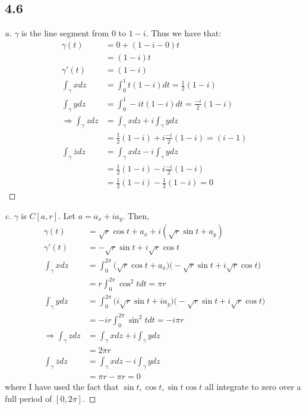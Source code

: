 \documentclass[a4paper, 11pt]{article}
\begin{document}
\subsection*{4.6}
	\begin{proof}[a]
		$\gamma$ is the line segment from $0$ to $1-i$. Thus we have that: 
			\begin{align*}
				\gamma(t) &= 0 +(1-i-0)t \\ 
					&= (1-i)t \\ 
				\gamma'(t) &= (1-i) \\ 
				\int_{\gamma}xdz &= \int_0^1 t(1-i)dt = \frac{1}{2}(1-i) \\ 
				\int_{\gamma}ydz &= \int_0^1 -it(1-i)dt = \frac{-i}{2}(1-i) \\ 
				\Rightarrow \int_\gamma z dz &= \int_\gamma x dz +i\int_\gamma y dz \\ 
					&= \frac{1}{2}(1-i)+i\frac{-i}{2}(1-i) = (i-1) \\ 
				\int_\gamma \overline{z} dz &=  \int_\gamma x dz -i\int_\gamma y dz \\ 
					&= \frac{1}{2}(1-i)-i\frac{-i}{2}(1-i) \\ 
					&= \frac{1}{2}(1-i)-\frac{1}{2}(1-i) = 0 
			\end{align*}
	\end{proof}
	
	\begin{proof}[c]
		$\gamma$ is $C[a,r]$. Let $a = a_x+ia_y$. Then, 
			\begin{align*}
				\gamma(t) &= \sqrt{r}\cos t + a_x + i (\sqrt{r}\sin t + a_y) \\ 
				\gamma'(t) &= -\sqrt{r}\sin t + i\sqrt{r}\cos t \\ 
				\int_\gamma xdz &= \int_0^{2\pi}\Big(\sqrt{r}\cos t+a_x\Big)\Big(-\sqrt{r}\sin t + i\sqrt{r}\cos t\Big) \\ 
					&= r\int_0^{2\pi}\cos^2 t dt = \pi r \\ 
				\int_\gamma ydz &= \int_0^{2\pi}\Big(i\sqrt{r}\sin t+ia_y\Big)\Big(-\sqrt{r}\sin t + i\sqrt{r}\cos t\Big) \\ 
				&= -ir\int_0^{2\pi}\sin^2 t dt = -i\pi r \\ 
				\Rightarrow \int_\gamma zdz &= \int_\gamma xdz + i\int_\gamma ydz \\ 
					&= 2\pi r \\ 
				\int_\gamma \overline{z}dz &= \int_\gamma xdz -i \int_\gamma y dz \\ 
					&= \pi r -\pi r = 0 
			\end{align*}
		where I have used the fact that $\sin t, \cos t, \sin t\cos t$ all integrate to zero over a full period of $[0, 2\pi]$. 
	\end{proof}
\end{document}
